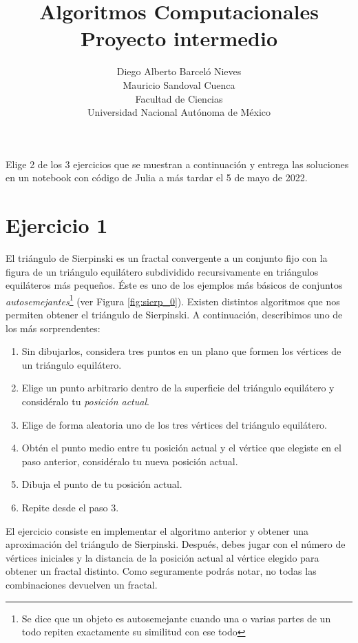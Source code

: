 \documentclass[a4paper]{article}
\begin{document}
\title{Algoritmos Computacionales \\ Proyecto intermedio}
\author{Diego Alberto Barceló Nieves  \\ Mauricio Sandoval Cuenca \\ Facultad de Ciencias \\ Universidad Nacional Autónoma de México}
\date{}
\maketitle

Elige 2 de los 3 ejercicios que se muestran a continuación y entrega las soluciones en un notebook con código de Julia a más tardar el 5 de mayo de 2022. 

\section*{Ejercicio 1} \label{Sec: Ejercicio 1}

El triángulo de Sierpinski es un fractal convergente a un conjunto fijo con la figura de un triángulo equilátero subdividido recursivamente en triángulos equiláteros más pequeños. Éste es uno de los ejemplos más básicos de conjuntos \textit{autosemejantes}\footnote{Se dice que un objeto es autosemejante cuando una o varias partes de un todo repiten exactamente su similitud con ese todo} (ver Figura \ref{fig:sierp_0}). Existen distintos algoritmos que nos permiten obtener el triángulo de Sierpinski. A continuación, describimos uno de los más sorprendentes:

\begin{enumerate}
    \item Sin dibujarlos, considera tres puntos en un plano que formen los vértices de un triángulo equilátero.
    \item Elige un punto arbitrario dentro de la superficie del triángulo equilátero y considéralo tu \textit{posición actual}.
    \item Elige de forma aleatoria uno de los tres vértices del triángulo equilátero.
    \item Obtén el punto medio entre tu posición actual y el vértice que elegiste en el paso anterior, considéralo tu nueva posición actual.
    \item Dibuja el punto de tu posición actual.
    \item Repite desde el paso 3.
\end{enumerate}

El ejercicio consiste en implementar el algoritmo anterior y obtener una aproximación del triángulo de Sierpinski. Después, debes jugar con el número de vértices iniciales y la distancia de la posición actual al vértice elegido para obtener un fractal distinto. Como seguramente podrás notar, no todas las combinaciones devuelven un fractal.
\end{document}

